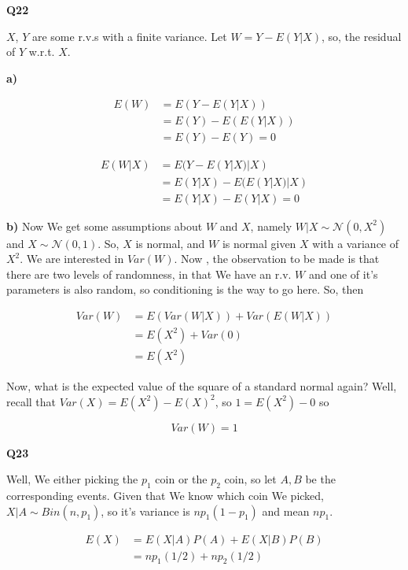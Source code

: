 \documentclass{article}
\begin{document}
			\hfill
			
		\textbf{Q22}
		
			$X$, $Y$ are some r.v.s with a finite variance. Let $W=Y-E(Y|X)$, so, the residual of $Y$ w.r.t. $X$.
			
			\textbf{a)} 
			
			\begin{align*}
			E(W) &= E(Y-E(Y|X))\\
			&= E(Y) - E(E(Y|X))\\
			&= E(Y) - E(Y) = 0
			\end{align*}
			
			\begin{align*}
			E(W|X) &= E(Y-E(Y|X)|X)\\
			&= E(Y|X) - E(E(Y|X)|X)\\
			&=E(Y|X) - E(Y|X) = 0
			\end{align*}
				
			\textbf{b)} Now We get some assumptions about $W$ and $X$, namely $W|X\sim\mathcal{N}(0, X^2)$ and $X\sim\mathcal{N}(0, 1)$. So, $X$ is normal, and $W$ is normal given $X$ with a variance of $X^2$. We are interested in $Var(W)$. Now , the observation to be made is that there are two levels of randomness, in that We have an r.v. $W$ and one of it's parameters is also random, so conditioning is the way to go here. So, then
			
			\begin{align*}
			Var(W) &= E(Var(W|X)) + Var(E(W|X))\\
			&= E(X^2) + Var(0)\\
			&= E(X^2)
			\end{align*}
			
			Now, what is the expected value of the square of a standard normal again? Well, recall that $Var(X) = E(X^2) - E(X)^2$, so $1 = E(X^2) - 0$ so
			
			\[Var(W) = 1\]
			
			\hfill
			
		\textbf{Q23}
		
			Well, We either picking the $p_1$ coin or the $p_2$ coin, so let $A, B$ be the corresponding events. Given that We know which coin We picked, $X|A\sim Bin(n, p_1)$, so it's variance is $np_1(1-p_1)$ and mean $np_1$.	
			
			\begin{align*}
			E(X) &= E(X|A)P(A) + E(X|B)P(B)\\
			&= np_1(1/2) + np_2(1/2)
			\end{align*}
			
\end{document}
